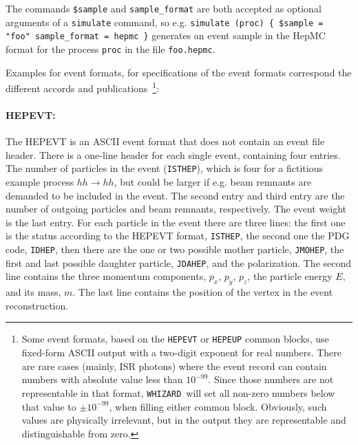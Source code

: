 \documentclass[12pt]{book}
\newcommand{\ttt}[1]{\texttt{#1}}
\newcommand{\whizard}{\ttt{WHIZARD}}
\begin{document}
The commands \ttt{\$sample} and \ttt{sample\_format} are both accepted
as optional arguments of a \ttt{simulate} command, so e.g.
\ttt{simulate (proc) \{ \$sample = "foo" sample\_format = hepmc \}}
generates an event sample in the HepMC format for the process
\ttt{proc} in the file \ttt{foo.hepmc}.

Examples for event formats, for specifications of the event formats correspond
the different accords and publications~\footnote{Some event formats, based on
  the \ttt{HEPEVT} or \ttt{HEPEUP} common blocks, use fixed-form ASCII output
  with a two-digit exponent for real numbers.  There are rare cases (mainly,
  ISR photons) where the event record can contain numbers with absolute value
  less than $10^{-99}$.  Since those numbers are not representable in that
  format, \whizard\ will set all non-zero numbers below that value to $\pm
  10^{-99}$, when filling either common block.  Obviously, such values are
  physically irrelevant, but in the output they are representable and
  distinguishable from zero.}:

\paragraph{HEPEVT:}

The HEPEVT is an ASCII event format that does not contain an event
file header. There is a one-line header for each single event,
containing four entries. The number of particles in the event
(\ttt{ISTHEP}), which is four for a fictitious example process $hh\to
hh$, but could be larger if e.g. beam remnants are demanded to be included in the
event. The second entry and third entry are the number of outgoing
particles and beam remnants, respectively. The event weight is the
last entry. For each particle in the event there are three lines:
the first one is the status according to the HEPEVT format,
\ttt{ISTHEP}, the second one the PDG code, \ttt{IDHEP}, then there are
the one or two possible mother particle, \ttt{JMOHEP}, the first and
last possible daughter particle, \ttt{JDAHEP}, and the polarization.
The second line contains the three momentum components, $p_x$, $p_y$,
$p_z$, the particle energy $E$, and its mass, $m$.
The last line contains the position of the vertex in the event
reconstruction.
\end{document}
